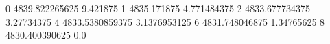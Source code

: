 0 4839.822265625 9.421875
1 4835.171875 4.771484375
2 4833.677734375 3.27734375
4 4833.5380859375 3.1376953125
6 4831.748046875 1.34765625
8 4830.400390625 0.0

